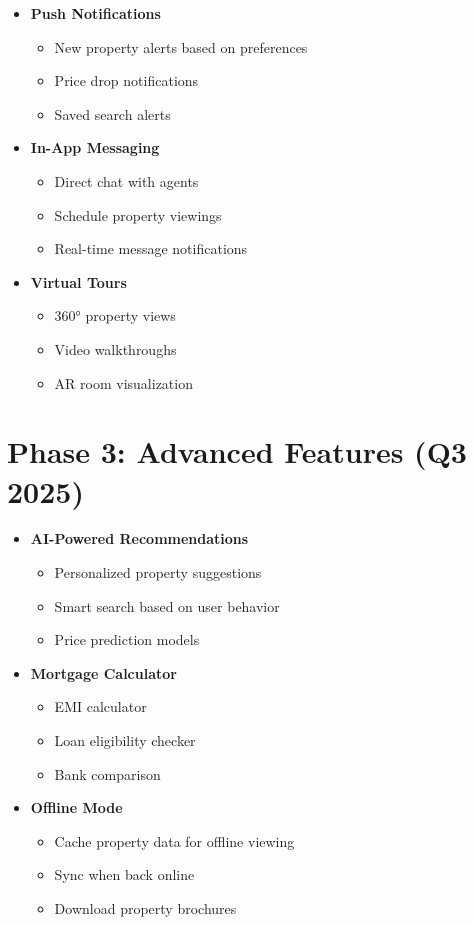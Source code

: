 \documentclass[11pt,a4paper,oneside]{book}
\begin{document}
\begin{itemize}
    \item \textbf{Push Notifications}
    \begin{itemize}
        \item New property alerts based on preferences
        \item Price drop notifications
        \item Saved search alerts
    \end{itemize}
    
    \item \textbf{In-App Messaging}
    \begin{itemize}
        \item Direct chat with agents
        \item Schedule property viewings
        \item Real-time message notifications
    \end{itemize}
    
    \item \textbf{Virtual Tours}
    \begin{itemize}
        \item 360° property views
        \item Video walkthroughs
        \item AR room visualization
    \end{itemize}
\end{itemize}

\section{Phase 3: Advanced Features (Q3 2025)}

\begin{itemize}
    \item \textbf{AI-Powered Recommendations}
    \begin{itemize}
        \item Personalized property suggestions
        \item Smart search based on user behavior
        \item Price prediction models
    \end{itemize}
    
    \item \textbf{Mortgage Calculator}
    \begin{itemize}
        \item EMI calculator
        \item Loan eligibility checker
        \item Bank comparison
    \end{itemize}
    
    \item \textbf{Offline Mode}
    \begin{itemize}
        \item Cache property data for offline viewing
        \item Sync when back online
        \item Download property brochures
    \end{itemize}
\end{itemize}
\end{document}
